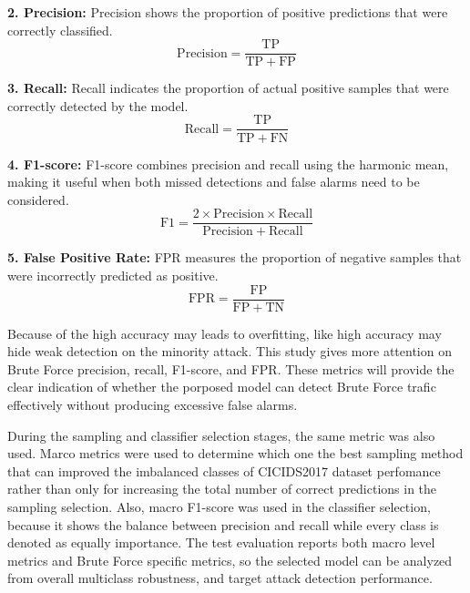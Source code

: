 \documentclass[12pt,a4paper]{article}
\begin{document}
\noindent\textbf{2. Precision:} Precision shows the proportion of positive predictions that were correctly classified.
\begin{equation}
\mathrm{Precision} = \frac{\mathrm{TP}}{\mathrm{TP}+\mathrm{FP}}
\label{eq:precision}
\end{equation}

\noindent\textbf{3. Recall:} Recall indicates the proportion of actual positive samples that were correctly detected by the model.
\begin{equation}
\mathrm{Recall} = \frac{\mathrm{TP}}{\mathrm{TP}+\mathrm{FN}}
\label{eq:recall}
\end{equation}

\noindent\textbf{4. F1-score:} F1-score combines precision and recall using the harmonic mean, making it useful when both missed detections and false alarms need to be considered.
\begin{equation}
\mathrm{F1} = \frac{2 \times \mathrm{Precision} \times \mathrm{Recall}}{\mathrm{Precision}+\mathrm{Recall}}
\label{eq:f1}
\end{equation}

\noindent\textbf{5. False Positive Rate:} FPR measures the proportion of negative samples that were incorrectly predicted as positive.
\begin{equation}
\mathrm{FPR} = \frac{\mathrm{FP}}{\mathrm{FP}+\mathrm{TN}}
\label{eq:fpr}
\end{equation}

Because of the high accuracy may leads to overfitting, like high accuracy may hide weak detection on the minority attack. This study gives more attention on Brute Force precision, recall, F1-score, and FPR. These metrics will provide the clear indication of whether the porposed model can detect Brute Force trafic effectively without producing excessive false alarms.

During the sampling and classifier selection stages, the same metric was also used. Marco metrics were used to determine which one the best sampling method that can improved the imbalanced classes of CICIDS2017 dataset perfomance rather than only for increasing the total number of correct predictions in the sampling selection. Also, macro F1-score was used in the classifier selection, because it shows the balance between precision and recall while every class is denoted as equally importance. The test evaluation reports both macro level metrics and Brute Force specific metrics, so the selected model can be analyzed from overall multiclass robustness, and target attack detection performance.
\end{document}
